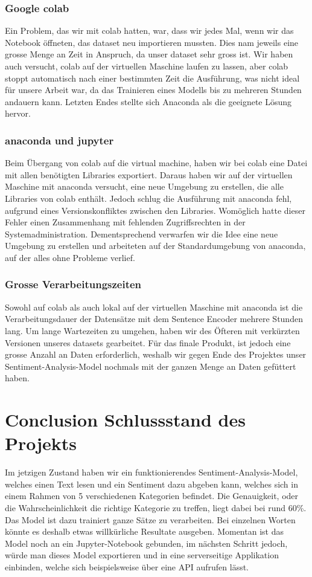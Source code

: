 \subsubsection*{Google \gls{colab}}
Ein Problem, das wir mit \gls{colab} hatten, war, dass wir jedes Mal, wenn wir das Notebook öffneten, das \gls{dataset} neu importieren mussten. Dies nam jeweils eine grosse Menge an Zeit in Anspruch, da unser \gls{dataset} sehr gross ist. Wir haben auch versucht, \gls{colab} auf der virtuellen Maschine laufen zu lassen, aber \gls{colab} stoppt automatisch nach einer bestimmten Zeit die Ausführung, was nicht ideal für unsere Arbeit war, da das Trainieren eines Modells bis zu mehreren Stunden andauern kann. Letzten Endes stellte sich Anaconda als die geeignete Lösung hervor.

\subsubsection*{\gls{anaconda} und \gls{jupyter}}
Beim Übergang von \gls{colab} auf die \gls{virtual machine}, haben wir bei \gls{colab} eine Datei mit allen benötigten Libraries exportiert. Daraus haben wir auf der virtuellen Maschine mit \gls{anaconda} versucht, eine neue Umgebung zu erstellen, die alle Libraries von \gls{colab} enthält. Jedoch schlug die Ausführung mit \gls{anaconda} fehl, aufgrund eines Versionskonfliktes zwischen den Libraries. Womöglich hatte dieser Fehler einen Zusammenhang mit fehlenden Zugriffsrechten in der Systemadministration. Dementsprechend verwarfen wir die Idee eine neue Umgebung zu erstellen und arbeiteten auf der Standardumgebung von \gls{anaconda}, auf der alles ohne Probleme verlief.

\subsubsection*{Grosse Verarbeitungszeiten}
Sowohl auf \gls{colab} als auch lokal auf der virtuellen Maschine mit \gls{anaconda} ist die Verarbeitungsdauer der Datensätze mit dem Sentence Encoder mehrere Stunden lang. Um lange Wartezeiten zu umgehen, haben wir des Öfteren mit verkürzten Versionen unseres \gls{dataset}s gearbeitet. Für das finale Produkt, ist jedoch eine grosse Anzahl an Daten erforderlich, weshalb wir gegen Ende des Projektes unser Sentiment-Analysis-Model nochmals mit der ganzen Menge an Daten gefüttert haben.
\newpage
\section{Conclusion Schlussstand des Projekts}
Im jetzigen Zustand haben wir ein funktionierendes Sentiment-Analysis-Model, welches einen Text lesen und ein Sentiment dazu abgeben kann, welches sich in einem Rahmen von 5 verschiedenen Kategorien befindet. Die Genauigkeit, oder die Wahrscheinlichkeit die richtige Kategorie zu treffen, liegt dabei bei rund 60\%. Das Model ist dazu trainiert ganze Sätze zu verarbeiten. Bei einzelnen Worten könnte es deshalb etwas willkürliche Resultate ausgeben. Momentan ist das Model noch an ein Jupyter-Notebook gebunden, im nächsten Schritt jedoch, würde man dieses Model exportieren und in eine serverseitige Applikation einbinden, welche sich beispielsweise über eine API aufrufen lässt.

